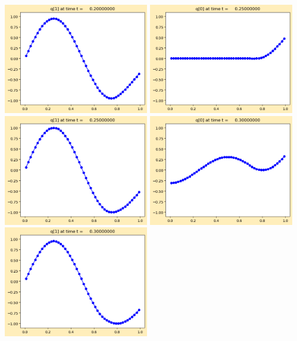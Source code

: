 \documentclass[11pt]{article}
\begin{document}
\includegraphics[width=0.475\textwidth]{frame0004fig1.png}
\vskip 10pt 
\includegraphics[width=0.475\textwidth]{frame0005fig0.png}
\includegraphics[width=0.475\textwidth]{frame0005fig1.png}
\vskip 10pt 
\includegraphics[width=0.475\textwidth]{frame0006fig0.png}
\includegraphics[width=0.475\textwidth]{frame0006fig1.png}
\end{document}
